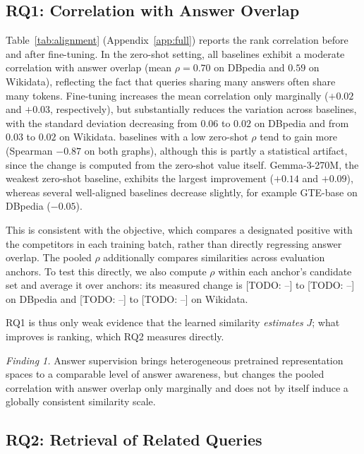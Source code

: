 \documentclass[runningheads]{llncs}
\newcommand{\hp}[1]{{\color{red!75!black}#1}}
\begin{document}
\subsection{RQ1: Correlation with Answer Overlap}
\label{sec:rq1}

Table~\ref{tab:alignment} (Appendix~\ref{app:full}) reports the rank
correlation before and after fine-tuning. In the zero-shot setting, all baselines exhibit a moderate
correlation with answer overlap (mean $\rho = 0.70$ on DBpedia and $0.59$ on
Wikidata), reflecting the fact that queries sharing many answers often share
many tokens. Fine-tuning increases the mean correlation only marginally
($+0.02$ and $+0.03$, respectively), but substantially reduces the variation
across baselines, with the standard deviation decreasing from $0.06$ to $0.02$
on DBpedia and from $0.03$ to $0.02$ on Wikidata. baselines with a low
zero-shot $\rho$ tend to gain more (Spearman $-0.87$ on both graphs), although
this is partly a statistical artifact, since the change is computed from the
zero-shot value itself. Gemma-3-270M, the weakest zero-shot baseline, exhibits the largest improvement
($+0.14$ and $+0.09$), whereas several well-aligned baselines decrease
slightly, for example GTE-base on DBpedia ($-0.05$).

This is consistent with the objective, which compares a designated positive
with the competitors in each training batch, rather than directly regressing
answer overlap. The pooled $\rho$ additionally compares similarities across
evaluation anchors. To test this
directly, we also compute $\rho$ within each anchor's candidate set and
average it over anchors: its measured change is \hp{[TODO: --]} to \hp{[TODO: --]} on
DBpedia and \hp{[TODO: --]} to \hp{[TODO: --]} on Wikidata.

RQ1 is thus only weak evidence that the learned similarity
\emph{estimates} $J$; what improves is ranking, which RQ2 measures directly.

\textit{Finding 1.} Answer supervision brings heterogeneous
pretrained representation spaces to a comparable level of answer awareness,
but changes the pooled correlation with answer overlap only marginally and
does not by itself induce a globally consistent similarity scale.

\subsection{RQ2: Retrieval of Related Queries}
\label{sec:rq2}


\end{document}
